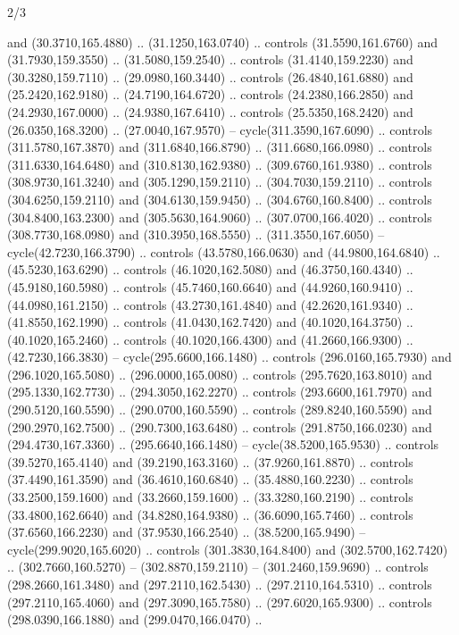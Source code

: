 \begin{flagdescription}{2/3}
\begin{scope}[xshift=0.5\flaglength,yshift=0.5\flagwidth,scale=\stretchfactor]
\begin{scope}[scale=0.001645\flagwidth,yshift=65mm,xshift=-63mm]
\begin{scope}[y=0.80pt, x=0.80pt, yscale=-1,]
\begin{scope}[cm={{1.33333,0.0,0.0,1.33333,(0.0,1e-05)}}]
  and (30.3710,165.4880) .. (31.1250,163.0740) .. controls (31.5590,161.6760)
  and (31.7930,159.3550) .. (31.5080,159.2540) .. controls (31.4140,159.2230)
  and (30.3280,159.7110) .. (29.0980,160.3440) .. controls (26.4840,161.6880)
  and (25.2420,162.9180) .. (24.7190,164.6720) .. controls (24.2380,166.2850)
  and (24.2930,167.0000) .. (24.9380,167.6410) .. controls (25.5350,168.2420)
  and (26.0350,168.3200) .. (27.0040,167.9570) -- cycle(311.3590,167.6090) ..
  controls (311.5780,167.3870) and (311.6840,166.8790) .. (311.6680,166.0980) ..
  controls (311.6330,164.6480) and (310.8130,162.9380) .. (309.6760,161.9380) ..
  controls (308.9730,161.3240) and (305.1290,159.2110) .. (304.7030,159.2110) ..
  controls (304.6250,159.2110) and (304.6130,159.9450) .. (304.6760,160.8400) ..
  controls (304.8400,163.2300) and (305.5630,164.9060) .. (307.0700,166.4020) ..
  controls (308.7730,168.0980) and (310.3950,168.5550) .. (311.3550,167.6050) --
  cycle(42.7230,166.3790) .. controls (43.5780,166.0630) and (44.9800,164.6840)
  .. (45.5230,163.6290) .. controls (46.1020,162.5080) and (46.3750,160.4340) ..
  (45.9180,160.5980) .. controls (45.7460,160.6640) and (44.9260,160.9410) ..
  (44.0980,161.2150) .. controls (43.2730,161.4840) and (42.2620,161.9340) ..
  (41.8550,162.1990) .. controls (41.0430,162.7420) and (40.1020,164.3750) ..
  (40.1020,165.2460) .. controls (40.1020,166.4300) and (41.2660,166.9300) ..
  (42.7230,166.3830) -- cycle(295.6600,166.1480) .. controls (296.0160,165.7930)
  and (296.1020,165.5080) .. (296.0000,165.0080) .. controls (295.7620,163.8010)
  and (295.1330,162.7730) .. (294.3050,162.2270) .. controls (293.6600,161.7970)
  and (290.5120,160.5590) .. (290.0700,160.5590) .. controls (289.8240,160.5590)
  and (290.2970,162.7500) .. (290.7300,163.6480) .. controls (291.8750,166.0230)
  and (294.4730,167.3360) .. (295.6640,166.1480) -- cycle(38.5200,165.9530) ..
  controls (39.5270,165.4140) and (39.2190,163.3160) .. (37.9260,161.8870) ..
  controls (37.4490,161.3590) and (36.4610,160.6840) .. (35.4880,160.2230) ..
  controls (33.2500,159.1600) and (33.2660,159.1600) .. (33.3280,160.2190) ..
  controls (33.4800,162.6640) and (34.8280,164.9380) .. (36.6090,165.7460) ..
  controls (37.6560,166.2230) and (37.9530,166.2540) .. (38.5200,165.9490) --
  cycle(299.9020,165.6020) .. controls (301.3830,164.8400) and
  (302.5700,162.7420) .. (302.7660,160.5270) -- (302.8870,159.2110) --
  (301.2460,159.9690) .. controls (298.2660,161.3480) and (297.2110,162.5430) ..
  (297.2110,164.5310) .. controls (297.2110,165.4060) and (297.3090,165.7580) ..
  (297.6020,165.9300) .. controls (298.0390,166.1880) and (299.0470,166.0470) ..

\end{scope}
\end{scope}
\end{scope}
\end{scope}
\end{flagdescription}
